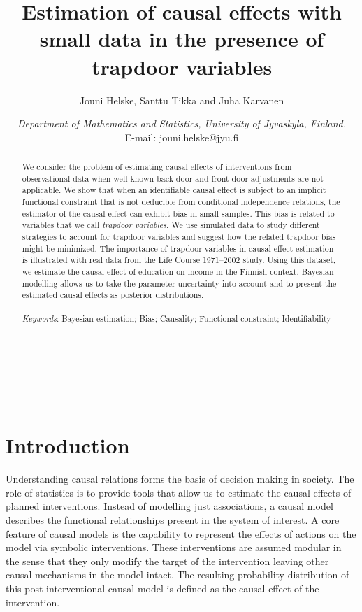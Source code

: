 \documentclass[11pt,a4paper,twoside]{article}
\title{Estimation of causal effects with small data in the presence of trapdoor variables}
\author{Jouni Helske, Santtu Tikka and Juha Karvanen}
\date{\textit{Department of Mathematics and Statistics, University of Jyvaskyla, Finland.} \\
E-mail: {\scriptsize jouni.helske@jyu.fi}}
\makeatletter
\renewcommand{\maketitle}{\bgroup\setlength{\parindent}{0pt}
\begin{flushleft}
  \sffamily\textbf{\Large \@title}\\
  ~\\
  \@author\\
  \@date
\end{flushleft}\egroup
}
\newcommand{\+}[1]{\ensuremath{\mathbf{#1}}}
\makeatother
\begin{document}
\maketitle
	
\begin{abstract}
	We consider the problem of estimating causal effects of interventions from observational data when well-known back-door and front-door adjustments are not applicable. We show that when an identifiable causal effect is subject to an implicit functional constraint that is not deducible from conditional independence relations, the estimator of the causal effect can exhibit bias in small samples. This bias is related to variables that we call \emph{trapdoor variables}. We use simulated data to study different strategies to account for trapdoor variables and suggest how the related trapdoor bias might be minimized. The importance of trapdoor variables in causal effect estimation is illustrated with real data from the Life Course 1971--2002 study. Using this dataset, we estimate the causal effect of education on income in the Finnish context. Bayesian modelling allows us to take the parameter uncertainty into account and to present the estimated causal effects as posterior distributions. \\
	~\\
	\textit{Keywords}: Bayesian estimation; Bias; Causality; Functional constraint; Identifiability
\end{abstract}
	
	
	
\section{Introduction}
\label{sec:introduction}

	Understanding causal relations forms the basis of decision making in society. The role of statistics is to provide tools that allow us to estimate the causal effects of planned interventions. Instead of modelling just associations, a causal model describes the functional relationships present in the system of interest. A core feature of causal models \citep{Pearl:book2009} is the capability to represent the effects of actions on the model via symbolic interventions. These interventions are assumed modular in the sense that they only modify the target of the intervention leaving other causal mechanisms in the model intact. The resulting probability distribution of this post-interventional causal model is defined as the causal effect of the intervention.
	
\end{document}
